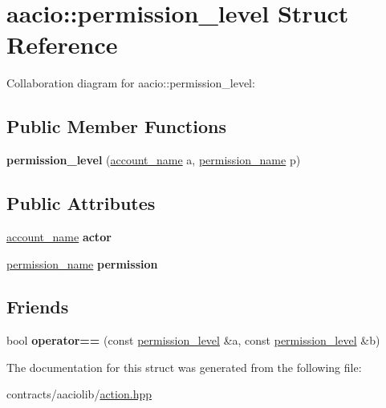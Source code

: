 \hypertarget{structaacio_1_1permission__level}{}\section{aacio\+:\+:permission\+\_\+level Struct Reference}
\label{structaacio_1_1permission__level}


Collaboration diagram for aacio\+:\+:permission\+\_\+level\+:
\subsection*{Public Member Functions}
\begin{DoxyCompactItemize}
\item 
\mbox{\label{structaacio_1_1permission__level_afe9d6c02ef6bb8073e1db21a279fe53b}} 
{\bfseries permission\+\_\+level} (\mbox{\hyperlink{structaacio_1_1chain_1_1name}{account\+\_\+name}} a, \mbox{\hyperlink{structaacio_1_1chain_1_1name}{permission\+\_\+name}} p)
\end{DoxyCompactItemize}
\subsection*{Public Attributes}
\begin{DoxyCompactItemize}
\item 
\mbox{\label{structaacio_1_1permission__level_ad477b241ffa694b2d2b91006d95ede4c}} 
\mbox{\hyperlink{structaacio_1_1chain_1_1name}{account\+\_\+name}} {\bfseries actor}
\item 
\mbox{\label{structaacio_1_1permission__level_a4fd92efee1970974260e46e41afec6ec}} 
\mbox{\hyperlink{structaacio_1_1chain_1_1name}{permission\+\_\+name}} {\bfseries permission}
\end{DoxyCompactItemize}
\subsection*{Friends}
\begin{DoxyCompactItemize}
\item 
\mbox{\label{structaacio_1_1permission__level_ae72dded282a3817d4d0bd9a7cf8d03fa}} 
bool {\bfseries operator==} (const \mbox{\hyperlink{structaacio_1_1permission__level}{permission\+\_\+level}} \&a, const \mbox{\hyperlink{structaacio_1_1permission__level}{permission\+\_\+level}} \&b)
\end{DoxyCompactItemize}


The documentation for this struct was generated from the following file\+:\begin{DoxyCompactItemize}
\item 
contracts/aaciolib/\mbox{\hyperlink{action_8hpp}{action.\+hpp}}\end{DoxyCompactItemize}
